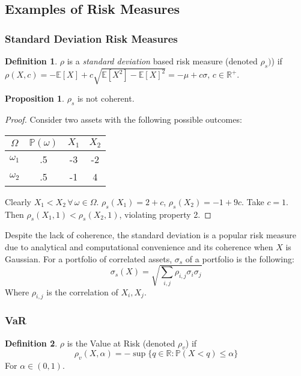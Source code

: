 \documentclass[12pt]{article}
\theoremstyle{definition}
\newtheorem{riskmeasure}{Definition}
\newtheorem{prop}{Proposition}
\begin{document}
\subsection{Examples of Risk Measures}


\subsubsection{Standard Deviation Risk Measures}
\begin{riskmeasure}
\(\rho\) is a \emph{standard deviation}  based risk measure (denoted \(\rho_s)\)) if \(\rho(X, c)=-\mathbb{E}[X]+c\sqrt{\mathbb{E}[X^2]-\mathbb{E}[X]^2}=-\mu+ c \sigma,\,c\in \mathbb{R}^+\).
\end{riskmeasure}

\begin{prop}
\(\rho_s\) is not coherent.
\end{prop}

\begin{proof}
Consider two assets with the following possible outcomes:
\begin{center}
\begin{tabular}{ c| c c c }
  \(\Omega\) & \(\mathbb{P}(\omega)\) & \(X_1\) & \(X_2\) \\
  \hline
  \(\omega_1\)  &.5 & -3 & -2 \\
  \(\omega_2\)  & .5 & -1 & 4 \\
\end{tabular}
\end{center}

Clearly \(X_1 < X_2 \,\forall \, \omega \in \Omega\).  \(\rho_s(X_1)=2+c\), \(\rho_s(X_2)=-1+9c\).  Take \(c=1\).  Then \(\rho_s(X_1, 1)<\rho_s(X_2, 1)\), violating property 2.  

\end{proof}

Despite the lack of coherence, the standard deviation is a popular risk measure due to analytical and computational convenience and its coherence when \(X\) is Gaussian.  For a portfolio of correlated assets, \(\sigma_s\) of a portfolio is the following:
\[\sigma_s (X)=\sqrt{\sum_{i, j} \rho_{i, j} \sigma_i \sigma_j }\]
Where \(\rho_{i, j}\) is the correlation of \(X_i, X_j\).

\subsubsection{VaR}

\begin{riskmeasure}
\(\rho\) is the Value at Risk (denoted \(\rho_v\)) if  \[\rho_v(X, \alpha)=-\sup{ \{q \in \mathbb{R}:\mathbb{P}(X< q) \leq \alpha\} }\] For \(\alpha \in (0, 1)\).\end{riskmeasure}
\end{document}
